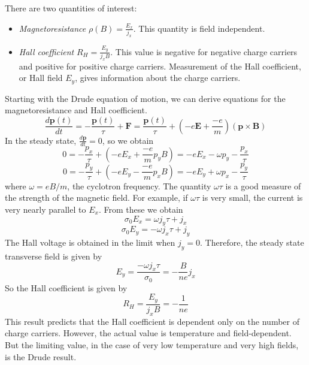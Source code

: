 \documentclass[10pt]{article}
\begin{document}
There are two quantities of interest:
\begin{itemize}
  \item \emph{Magnetoresistance} $\rho(B) = \frac{E_{x}}{j_{x}}$. This quantity is field independent.
  \item \emph{Hall coefficient} $R_{H} = \frac{E_{y}}{j_{x}B}$. This value is negative for negative charge carriers
  and positive for positive charge carriers. Measurement of the Hall coefficient, or Hall field $E_{y}$, gives information
  about the charge carriers.
\end{itemize}

Starting with the Drude equation of motion, we can derive equations for the magnetoresistance and Hall coefficient.
$$\frac{d\textbf{p}(t)}{dt} =  - \frac{\textbf{p}(t)}{\tau} + \textbf{F} = \frac{\textbf{p}(t)}{\tau} + \left (-e\textbf{E} + \frac{-e}{m}\right)(\textbf{p}\times\textbf{B})$$
In the steady state, $\frac{d\textbf{p}}{dt} = 0$, so we obtain
$$
0 = -\frac{p_{x}}{\tau} + (-eE_{x} + \frac{-e}{m}p_{y}B) = -eE_{x} - \omega p_{y} - \frac{p_{x}}{\tau}
$$
$$
0 = -\frac{p_{y}}{\tau} + (-eE_{y} - \frac{-e}{m}p_{x}B) = -eE_{y} + \omega p_{x} - \frac{p_{y}}{\tau}
$$
where $\omega = eB/m$, the cyclotron frequency. The quantity $\omega \tau$ is a good
measure of the strength of the magnetic field. For example, if $\omega \tau$ is very small, the current
is very nearly parallel to $E_{x}$.  From these we obtain
$$
\sigma_{0}E_{x} = \omega j_{y}\tau + j_{x}
$$
$$
\sigma_{0}E_{y} = - \omega j_{x} \tau + j_{y}
$$
The Hall voltage is obtained in the limit when $j_{y} = 0$. Therefore, the steady state transverse field is given by
$$E_{y} = \frac{- \omega j_{x}\tau}{\sigma_{0}} = -\frac{B}{ne}j_{x}$$
So the Hall coefficient is given by
$$R_{H} = \frac{E_{y}}{j_{x}B} = -\frac{1}{ne}$$
This result predicts that the Hall coefficient is dependent only on the number of charge carriers. However, the actual value is
temperature and field-dependent. But the limiting value, in the case of very low temperature and very high fields, is the Drude
result.
\end{document}
